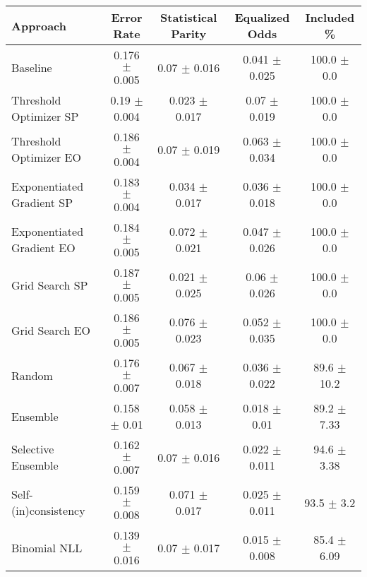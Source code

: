 \begin{tabular} {lcccc}
\toprule
\textbf{Approach} & \textbf{Error Rate} & \textbf{Statistical Parity} & \textbf{Equalized Odds} & \textbf{Included \%} \\ \midrule
Baseline & 0.176 $\pm$ 0.005 & 0.07 $\pm$ 0.016 & 0.041 $\pm$ 0.025 & \cellcolor{gold!30}100.0 $\pm$ 0.0 \\ 
Threshold Optimizer SP & 0.19 $\pm$ 0.004 & \cellcolor{silver!30}0.023 $\pm$ 0.017 & 0.07 $\pm$ 0.019 & \cellcolor{gold!30}100.0 $\pm$ 0.0 \\ 
Threshold Optimizer EO & 0.186 $\pm$ 0.004 & 0.07 $\pm$ 0.019 & 0.063 $\pm$ 0.034 & \cellcolor{gold!30}100.0 $\pm$ 0.0 \\ 
Exponentiated Gradient SP & 0.183 $\pm$ 0.004 & \cellcolor{bronze!30}0.034 $\pm$ 0.017 & 0.036 $\pm$ 0.018 & \cellcolor{gold!30}100.0 $\pm$ 0.0 \\ 
Exponentiated Gradient EO & 0.184 $\pm$ 0.005 & 0.072 $\pm$ 0.021 & 0.047 $\pm$ 0.026 & \cellcolor{gold!30}100.0 $\pm$ 0.0 \\ 
Grid Search SP & 0.187 $\pm$ 0.005 & \cellcolor{gold!30}0.021 $\pm$ 0.025 & 0.06 $\pm$ 0.026 & \cellcolor{gold!30}100.0 $\pm$ 0.0 \\ 
Grid Search EO & 0.186 $\pm$ 0.005 & 0.076 $\pm$ 0.023 & 0.052 $\pm$ 0.035 & \cellcolor{gold!30}100.0 $\pm$ 0.0 \\ 
Random & 0.176 $\pm$ 0.007 & 0.067 $\pm$ 0.018 & 0.036 $\pm$ 0.022 & 89.6 $\pm$ 10.2 \\ 
Ensemble & \cellcolor{silver!30}0.158 $\pm$ 0.01 & 0.058 $\pm$ 0.013 & \cellcolor{silver!30}0.018 $\pm$ 0.01 & 89.2 $\pm$ 7.33 \\ 
Selective Ensemble & 0.162 $\pm$ 0.007 & 0.07 $\pm$ 0.016 & \cellcolor{bronze!30}0.022 $\pm$ 0.011 & 94.6 $\pm$ 3.38 \\ 
Self-(in)consistency & \cellcolor{bronze!30}0.159 $\pm$ 0.008 & 0.071 $\pm$ 0.017 & 0.025 $\pm$ 0.011 & 93.5 $\pm$ 3.2 \\ 
Binomial NLL & \cellcolor{gold!30}0.139 $\pm$ 0.016 & 0.07 $\pm$ 0.017 & \cellcolor{gold!30}0.015 $\pm$ 0.008 & 85.4 $\pm$ 6.09 \\ 
\bottomrule
\end{tabular}
